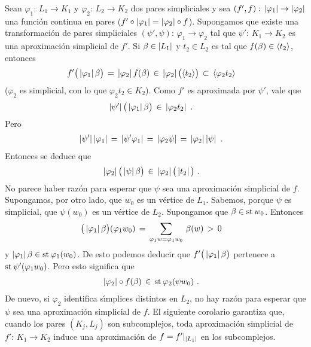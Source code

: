 Sean $\varphi_{1}:\,L_{1}\rightarrow K_{1}$ y
$\varphi_{2}:\,L_{2}\rightarrow K_{2}$ dos pares simpliciales y sea
$(f',f):\,\left|\varphi_{1}\right|\rightarrow\left|\varphi_{2}\right|$ una funci\'{o}n
continua en pares ($f'\circ\left|\varphi_{1}\right|=\left|\varphi_{2}\right|\circ f$).
Supongamos que existe una transformaci\'{o}n de pares simpliciales
$(\psi',\psi):\,\varphi_{1}\rightarrow\varphi_{2}$ tal que
$\psi':\,K_{1}\rightarrow K_{2}$ es una aproximaci\'{o}n simplicial de $f'$.
Si $\beta\in\left|L_{1}\right|$ y $t_{2}\in L_{2}$ es tal que
$f(\beta)\in\langle t_{2}\rangle$, entonces
\begin{align*}
	f'\big(\left|\varphi_{1}\right|\beta\big) & \,=\,
		\left|\varphi_{2}\right|f(\beta) \,\in\,
		\left|\varphi_{2}\right|\big(\langle t_{2}\rangle\big) \,\subset\,
		\langle\varphi_{2}t_{2}\rangle
\end{align*}
%
($\varphi_{2}$ es simplicial, con lo que $\varphi_{2}t_{2}\in K_{2}$). Como
$f'$ es aproximada por $\psi'$, vale que
\begin{align*}
	\left|\psi'\right|\big(\left|\varphi_{1}\right|\beta\big) & \,\in\,
		\left|\varphi_{2}t_{2}\right|
	\text{ .}
\end{align*}
%
Pero
\begin{align*}
	\left|\psi'\right|\left|\varphi_{1}\right| & \,=\,\left|\psi'\varphi_{1}\right|\,=\,
		\left|\varphi_{2}\psi\right|\,=\,\left|\varphi_{2}\right|\left|\psi\right|
	\text{ .}
\end{align*}
%
Entonces se deduce que
\begin{align*}
	\left|\varphi_{2}\right|\big(\left|\psi\right|\beta\big) & \,\in\,
		\left|\varphi_{2}\right|\big(\left|t_{2}\right|\big)
	\text{ .}
\end{align*}
%
No parece haber raz\'{o}n para esperar que $\psi$ sea una aproximaci\'{o}n
simplicial de $f$. Supongamos, por otro lado, que $w_{0}$ es un v\'{e}rtice de
$L_{1}$. Sabemos, porque $\psi$ es simplicial, que $\psi(w_{0})$ es un
v\'{e}rtice de $L_{2}$.
Supongamos que $\beta\in\mathrm{st}_{}\,w_{0}$.
Entonces
\begin{align*}
	\big(\left|\varphi_{1}\right|\beta\big)(\varphi_{1}w_{0}) & \,=\,
		\sum_{\varphi_{1}w=\varphi_{1}w_{0}}\,\beta(w) \,>\,0
\end{align*}
%
y $\left|\varphi_{1}\right|\beta\in\mathrm{st}_{}\,\varphi_{1}(w_{0})$. De esto podemos
deducir que $f'\big(\left|\varphi_{1}\right|\beta\big)$ pertenece a
$\mathrm{st}_{}\,\psi'(\varphi_{1}w_{0})$. Pero esto significa que
\begin{align*}
	\left|\varphi_{2}\right|\circ f(\beta) & \,\in\,
		\mathrm{st}_{}\,\varphi_{2}(\psi w_{0})
	\text{ .}
\end{align*}
%
De nuevo, si $\varphi_{2}$ identifica s\'{\i}mplices distintos en $L_{2}$,
no hay raz\'{o}n para esperar que $\psi$ sea una aproximaci\'{o}n simplicial
de $f$. El siguiente corolario garantiza que, cuando los pares $(K_{j},L_{j})$
son subcomplejos, toda aproximaci\'{o}n simplicial de
$f':\,K_{1}\rightarrow K_{2}$ induce una aproximaci\'{o}n de
$f=f'|_{\left|L_{1}\right|}$ en los subcomplejos.

